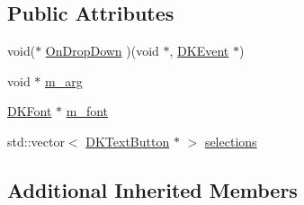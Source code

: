 \subsection*{Public Attributes}
\begin{DoxyCompactItemize}
\item 
void($\ast$ \hyperlink{class_d_k_drop_down_a08a4e1985d4876815f4c9e6c6f869157}{On\-Drop\-Down} )(void $\ast$, \hyperlink{class_d_k_event}{D\-K\-Event} $\ast$)
\item 
void $\ast$ \hyperlink{class_d_k_drop_down_a5df92d09ed2a3bfbb3d1b692a31cc9d3}{m\-\_\-arg}
\item 
\hyperlink{class_d_k_font}{D\-K\-Font} $\ast$ \hyperlink{class_d_k_drop_down_af6406055b8fa794eb2410b7a49eb025c}{m\-\_\-font}
\item 
std\-::vector$<$ \hyperlink{class_d_k_text_button}{D\-K\-Text\-Button} $\ast$ $>$ \hyperlink{class_d_k_drop_down_a3d2050f7629f66e0a815b9cac5f1d4e6}{selections}
\end{DoxyCompactItemize}
\subsection*{Additional Inherited Members}


